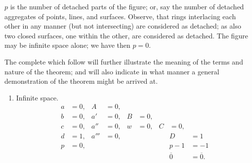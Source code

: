 \documentclass[11pt,a4paper]{book}
\begin{document}
$p$ is the number of detached parts of the figure; or, say the number of detached
aggregates of points, lines, and surfaces. Observe, that rings interlacing each other
in any manner (but not intersecting) are considered as detached; as also two closed
surfaces, one within the other, are considered as detached. The figure may be infinite
space alone; we have then $p = 0$.

The complete which follow will further illustrate the meaning of the terms and
nature of the theorem; and will also indicate in what manner a general demonstration
of the theorem might be arrived at.

\begin{enumerate}
\item Infinite space.
\begin{align*}
a &= 0, & A &= 0, \\
b &= 0, & a' &= 0, & B &= 0, \\
c &= 0, & a'' &= 0, & w &= 0, & C &= 0, \\
d &= 1, & a''' &= 0, & & & & D &= 1 \\
p &= 0, & & & & & & p - 1 &= -1 \\[2pt]
& & & & & & & \overline{0} &= \overline{0}.
\end{align*}
\end{enumerate}

\clearpage
\end{document}
